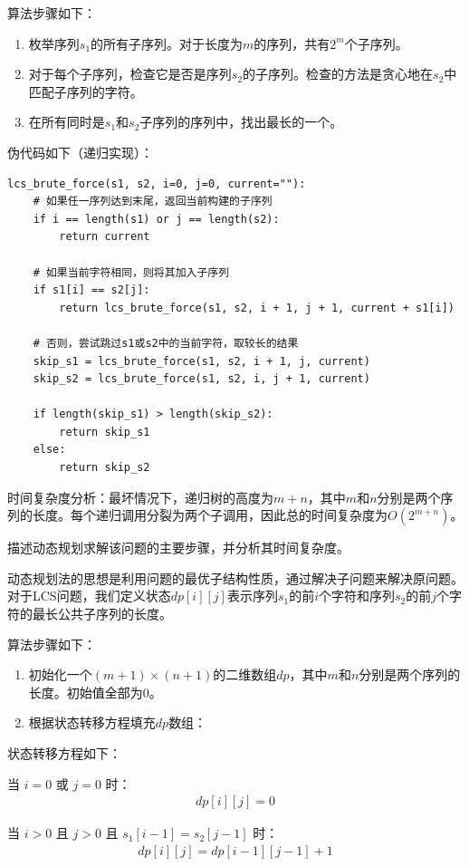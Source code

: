 \documentclass[12pt,twoside]{article}
\begin{document}
\begin{problems}
算法步骤如下：
\begin{enumerate}
    \item 枚举序列$s_1$的所有子序列。对于长度为$m$的序列，共有$2^m$个子序列。
    \item 对于每个子序列，检查它是否是序列$s_2$的子序列。检查的方法是贪心地在$s_2$中匹配子序列的字符。
    \item 在所有同时是$s_1$和$s_2$子序列的序列中，找出最长的一个。
\end{enumerate}

伪代码如下（递归实现）：
\begin{verbatim}
lcs_brute_force(s1, s2, i=0, j=0, current=""):
    # 如果任一序列达到末尾，返回当前构建的子序列
    if i == length(s1) or j == length(s2):
        return current
    
    # 如果当前字符相同，则将其加入子序列
    if s1[i] == s2[j]:
        return lcs_brute_force(s1, s2, i + 1, j + 1, current + s1[i])
    
    # 否则，尝试跳过s1或s2中的当前字符，取较长的结果
    skip_s1 = lcs_brute_force(s1, s2, i + 1, j, current)
    skip_s2 = lcs_brute_force(s1, s2, i, j + 1, current)
    
    if length(skip_s1) > length(skip_s2):
        return skip_s1
    else:
        return skip_s2
\end{verbatim}

时间复杂度分析：最坏情况下，递归树的高度为$m+n$，其中$m$和$n$分别是两个序列的长度。每个递归调用分裂为两个子调用，因此总的时间复杂度为$O(2^{m+n})$。

\ppart 描述动态规划求解该问题的主要步骤，并分析其时间复杂度。

动态规划法的思想是利用问题的最优子结构性质，通过解决子问题来解决原问题。对于LCS问题，我们定义状态$dp[i][j]$表示序列$s_1$的前$i$个字符和序列$s_2$的前$j$个字符的最长公共子序列的长度。

算法步骤如下：
\begin{enumerate}
    \item 初始化一个$(m+1) \times (n+1)$的二维数组$dp$，其中$m$和$n$分别是两个序列的长度。初始值全部为0。
    \item 根据状态转移方程填充$dp$数组：
\end{enumerate}

状态转移方程如下：

当 $i = 0$ 或 $j = 0$ 时：
\begin{align}
dp[i][j] = 0
\end{align}

当 $i > 0$ 且 $j > 0$ 且 $s_1[i-1] = s_2[j-1]$ 时：
\begin{align}
dp[i][j] = dp[i-1][j-1] + 1
\end{align}


\end{problems}
\end{document}
